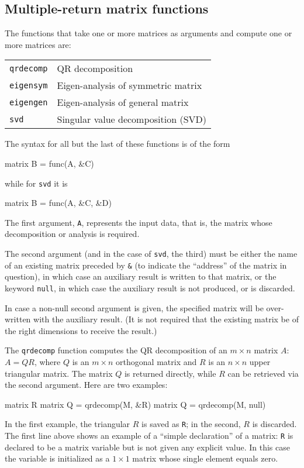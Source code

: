\subsection{Multiple-return matrix functions}
\label{matrix-multiples}

The functions that take one or more matrices as arguments and compute
one or more matrices are:

\begin{center}
\begin{tabular}{ll}
\texttt{qrdecomp} & QR decomposition \\
\texttt{eigensym} & Eigen-analysis of symmetric matrix \\
\texttt{eigengen} & Eigen-analysis of general matrix \\
\texttt{svd}      & Singular value decomposition (SVD) 
\end{tabular}
\end{center}

The syntax for all but the last of these functions is of the form
%
\begin{code}
matrix B = func(A, &C)
\end{code}
%
while for \texttt{svd} it is
%
\begin{code}
matrix B = func(A, &C, &D)
\end{code}
%
The first argument, \texttt{A}, represents the input data, that is,
the matrix whose decomposition or analysis is required.

The second argument (and in the case of \texttt{svd}, the third) must
be either the name of an existing matrix preceded by \verb+&+ (to
indicate the ``address'' of the matrix in question), in which case an
auxiliary result is written to that matrix, or the keyword
\texttt{null}, in which case the auxiliary result is not produced, or
is discarded.

In case a non-null second argument is given, the specified matrix will
be over-written with the auxiliary result.  (It is not required that
the existing matrix be of the right dimensions to receive the result.)

The \texttt{qrdecomp} function computes the QR decomposition of an $m
\times n$ matrix $A$: $A = QR$, where $Q$ is an $m \times n$
orthogonal matrix and $R$ is an $n \times n$ upper triangular matrix.
The matrix $Q$ is returned directly, while $R$ can be retrieved via
the second argument.  Here are two examples:
%
\begin{code}
matrix R
matrix Q = qrdecomp(M, &R)
matrix Q = qrdecomp(M, null)
\end{code}
%
In the first example, the triangular $R$ is saved as \texttt{R}; in
the second, $R$ is discarded.  The first line above shows an example
of a ``simple declaration'' of a matrix: \texttt{R} is
declared to be a matrix variable but is not given any explicit value.
In this case the variable is initialized as a $1\times 1$ matrix whose
single element equals zero.

